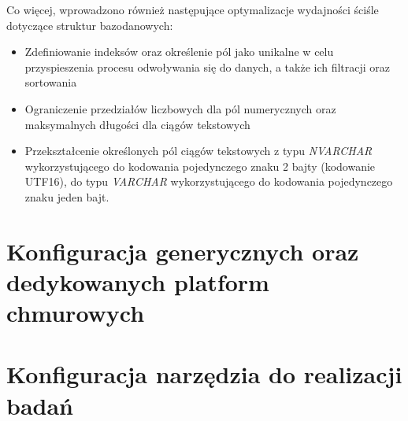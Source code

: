 Co więcej, wprowadzono również następujące optymalizacje wydajności ściśle dotyczące struktur bazodanowych:
\begin{itemize}
    \item Zdefiniowanie indeksów oraz określenie pól jako unikalne w celu przyspieszenia procesu odwoływania się do danych, a także ich filtracji oraz sortowania
    \item Ograniczenie przedziałów liczbowych dla pól numerycznych oraz maksymalnych długości dla ciągów tekstowych
    \item Przekształcenie określonych pól ciągów tekstowych z typu \textit{NVARCHAR} wykorzystującego do kodowania pojedynczego znaku 2 bajty (kodowanie UTF16), do typu \textit{VARCHAR} wykorzystującego do kodowania pojedynczego znaku jeden bajt.
\end{itemize}
\section{Konfiguracja generycznych oraz dedykowanych platform chmurowych}
\section{Konfiguracja narzędzia do realizacji badań}


